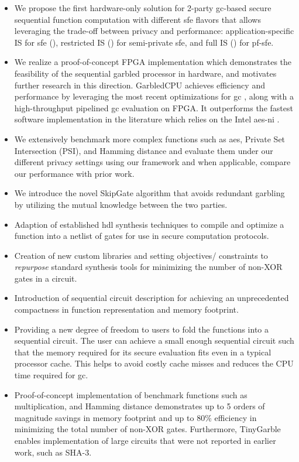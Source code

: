 \begin{itemize}
\item We propose the first hardware-only solution for 2-party \acrshort{gc}-based secure sequential function computation with different \acrshort{sfe} flavors that allows leveraging the trade-off between privacy and performance: application-specific IS for \acrshort{sfe} (), restricted IS () for semi-private \acrshort{sfe}, and full IS () for \acrshort{pf-sfe}.
\item We realize a proof-of-concept FPGA implementation which demonstrates the feasibility of the sequential garbled processor in hardware, and motivates further research in this direction. GarbledCPU achieves efficiency and performance by leveraging the most recent optimizations for \acrshort{gc} \cite{kolesnikov2008improved,bellare2013efficient,zahur2015two,songhori2015tinygarble}, along with a high-throughput pipelined \acrshort{gc} evaluation on FPGA. It outperforms the fastest software implementation in the literature which relies on the Intel \acrshort{aes-ni} \cite{bellare2013efficient}.
\item We extensively benchmark more complex functions such as \acrshort{aes}, Private Set Intersection (PSI), and Hamming distance and evaluate them under our different privacy settings using our framework and when applicable, compare our performance with prior work.
\item We introduce the novel SkipGate algorithm that avoids redundant garbling by utilizing the mutual knowledge between the two parties.
\item
  Adaption of established \acrshort{hdl} synthesis techniques to compile and optimize a function into a netlist of gates for use in secure computation protocols.
\item
  Creation of new custom libraries and setting objectives/ constraints to \emph{repurpose} standard synthesis tools for minimizing the number of non-XOR gates in a circuit.
\item
  Introduction of sequential circuit description for achieving an unprecedented compactness in function representation and memory footprint.
\item
  Providing a new degree of freedom to users to fold the functions into a sequential circuit.
  The user can achieve a small enough sequential circuit such that the memory required for its secure evaluation fits even in a typical processor cache.
  This helps to avoid costly cache misses and reduces the CPU time required for \acrshort{gc}.
\item
  Proof-of-concept implementation of benchmark functions such as multiplication, and Hamming distance demonstrates up to 5 orders of magnitude savings in memory footprint and up to $80\%$ efficiency in minimizing the total number of non-XOR gates.
  Furthermore, TinyGarble enables implementation of large circuits that were not reported in earlier work, such as SHA-3.%


\end{itemize}
